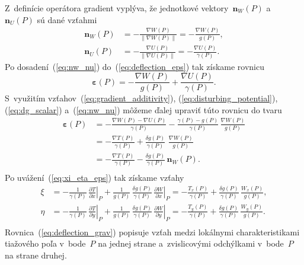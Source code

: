\documentclass[a4paper, 12pt]{book}
\let\vec\mathbf
\begin{document}
Z~definície operátora gradient vyplýva, že jednotkové vektory~$\vec n_W(P)$ 
a~$\vec n_U(P)$ sú dané vzťahmi
%
\begin{equation}
\label{eq:nw_nu}
\begin{split}
\vec n_W(P) &= -\frac{\nabla W(P)}{\| \nabla W(P) \|} = -\frac{\nabla 
W(P)}{g(P)}{,}\\
%
\vec n_U(P) &= -\frac{\nabla U(P)}{\| \nabla U(P) \|} = -\frac{\nabla 
U(P)}{\gamma(P)}{.}
\end{split}
\end{equation}
%
Po dosadení~(\ref{eq:nw_nu}) do~(\ref{eq:deflection_eps}) tak získame rovnicu
%
\begin{equation}
\label{eq:deflection_eps2}
\boldsymbol\varepsilon(P) = -\frac{\nabla W(P)}{g(P)} + \frac{\nabla 
U(P)}{\gamma(P)}{.}
\end{equation}
%
S~využitím vzťahov~(\ref{eq:gradient_additivity}), 
(\ref{eq:disturbing_potential}),  (\ref{eq:dg_scalar}) a~(\ref{eq:nw_nu}) 
môžeme ďalej upraviť túto rovnicu do tvaru
%
\begin{equation}
\label{eq:deflection_eps3}
\begin{split}
\boldsymbol\varepsilon(P) &= - \frac{\nabla W(P) - \nabla U(P)}{\gamma(P)} 
- \frac{\gamma(P) - g(P)}{\gamma(P)} \, \frac{\nabla W(P)}{g(P)}\\
%
&= - \frac{\nabla T(P)}{\gamma(P)} + \frac{\delta g(P)}{\gamma(P)} \,  \, 
\frac{\nabla W(P)}{g(P)}\\
%
&= - \frac{\nabla T(P)}{\gamma(P)} - \frac{\delta g(P)}{\gamma(P)} \, \vec 
n_W(P){.}\\
\end{split}
\end{equation}
%
Po uvážení~(\ref{eq:xi_eta_eps}) tak získame vzťahy
%
\begin{equation}
\label{eq:deflection_grav}
\begin{split}
\xi &= -\frac{1}{\gamma(P)} \, \left.\frac{\partial T}{\partial x}\right|_{P} 
+ \frac{1}{g(P)} \, \frac{\delta g(P)}{\gamma(P)} \, \left.\frac{\partial 
W}{\partial x}\right|_P = -\frac{T_x(P)}{\gamma(P)} + \frac{\delta 
g(P)}{\gamma(P)} \, \frac{W_x(P)}{g(P)}{,}\\
%
\eta &= -\frac{1}{\gamma(P)} \, \left.\frac{\partial T}{\partial y}\right|_{P} 
+ \frac{1}{g(P)} \, \frac{\delta g(P)}{\gamma(P)} \, \left.\frac{\partial 
W}{\partial y}\right|_P= -\frac{T_y(P)}{\gamma(P)} + \frac{\delta 
g(P)}{\gamma(P)} \, \frac{W_y(P)}{g(P)}{.}\\
\end{split}
\end{equation}
%
Rovnica~(\ref{eq:deflection_grav}) popisuje vzťah medzi lokálnymi 
charakteristikami tiažového poľa v~bode~$P$ na jednej strane a~zvislicovými 
odchýlkami v~bode~$P$ na strane druhej.
\end{document}

